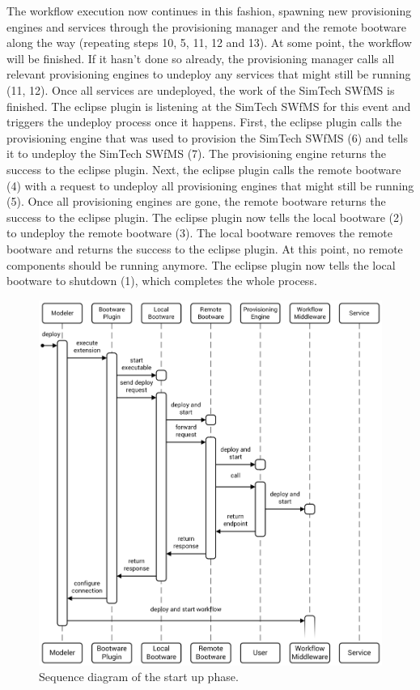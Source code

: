 The workflow execution now continues in this fashion, spawning new provisioning engines and services through the provisioning manager and the remote bootware along the way (repeating steps 10, 5, 11, 12 and 13).
At some point, the workflow will be finished.
If it hasn't done so already, the provisioning manager calls all relevant provisioning engines to undeploy any services that might still be running (11, 12).
Once all services are undeployed, the work of the SimTech SWfMS is finished.
The eclipse plugin is listening at the SimTech SWfMS for this event and triggers the undeploy process once it happens.
First, the eclipse plugin calls the provisioning engine that was used to provision the SimTech SWfMS (6) and tells it to undeploy the SimTech SWfMS (7).
The provisioning engine returns the success to the eclipse plugin.
Next, the eclipse plugin calls the remote bootware (4) with a request to undeploy all provisioning engines that might still be running (5).
Once all provisioning engines are gone, the remote bootware returns the success to the eclipse plugin.
The eclipse plugin now tells the local bootware (2) to undeploy the remote bootware (3).
The local bootware removes the remote bootware and returns the success to the eclipse plugin.
At this point, no remote components should be running anymore.
The eclipse plugin now tells the local bootware to shutdown (1), which completes the whole process.

\begin{figure}[!htbp]
	\centering
	\includegraphics[resolution=600]{process/assets/startup_sequence}
	\caption{Sequence diagram of the start up phase.}
	\label{image:startup_sequence}
\end{figure}

